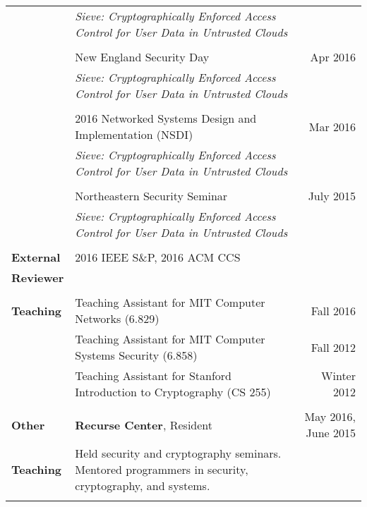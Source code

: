 \documentclass[a4paper,10pt]{article}
\begin{document}
\begin{longtable}{ p{0.9in} l @{\extracolsep{\fill}} r}
& \begin{minipage}[t]{0.6 \textwidth} 
\textit{Sieve: Cryptographically Enforced Access Control for User Data in Untrusted Clouds} \end{minipage} & \\ \\
& New England Security Day & Apr 2016 \\
& \begin{minipage}[t]{0.6 \textwidth}
\textit{Sieve: Cryptographically Enforced Access Control for User Data in Untrusted Clouds} \end{minipage} & \\ \\
& 2016 Networked Systems Design and Implementation (NSDI) & Mar 2016 \\
& \begin{minipage}[t]{0.6 \textwidth} 
\textit{Sieve: Cryptographically Enforced Access Control for User Data in Untrusted Clouds} \end{minipage} & \\ \\
& Northeastern Security Seminar & July 2015 \\
& \begin{minipage}[t]{0.6 \textwidth} 
\textit{Sieve: Cryptographically Enforced Access Control for User Data in Untrusted Clouds} \end{minipage} & \\ \\


\textbf{External} & 2016 IEEE S\&P, 2016 ACM CCS & \\
\textbf{Reviewer} & & \\ \\

\textbf{Teaching} 
& Teaching Assistant for MIT Computer Networks (6.829) & Fall 2016 \\
& Teaching Assistant for MIT Computer Systems Security (6.858) & Fall 2012 \\
& Teaching Assistant for Stanford Introduction to Cryptography (CS 255) & Winter 2012 \\ \\

\textbf{Other} & \textbf{Recurse Center}, Resident & May 2016, June 2015 \\ 
\textbf{Teaching} & \begin{minipage}[t]{0.5 \textwidth} 
Held security and cryptography seminars. Mentored programmers 
in security, cryptography, and systems. 
\end{minipage} \\ \\


\end{longtable}
\end{document}
